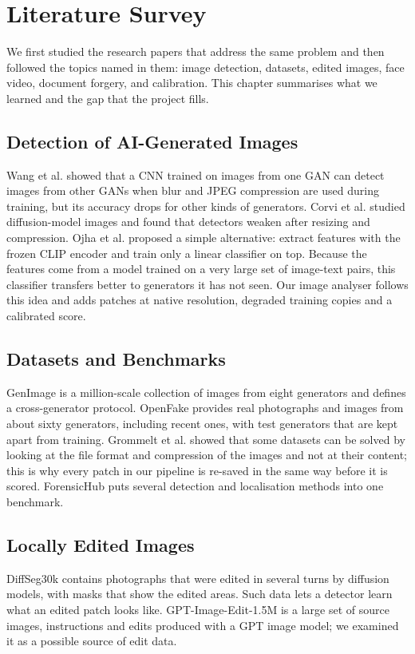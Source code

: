 \chapter{Literature Survey}
We first studied the research papers that address the same problem and then followed the topics named in them: image detection, datasets, edited images, face video, document forgery, and calibration. This chapter summarises what we learned and the gap that the project fills.

\section{Detection of AI-Generated Images}
Wang et al. \cite{wang} showed that a CNN trained on images from one GAN can detect images from other GANs when blur and JPEG compression are used during training, but its accuracy drops for other kinds of generators. Corvi et al. \cite{corvi} studied diffusion-model images and found that detectors weaken after resizing and compression. Ojha et al. \cite{ojha} proposed a simple alternative: extract features with the frozen CLIP encoder \cite{radford} and train only a linear classifier on top. Because the features come from a model trained on a very large set of image-text pairs, this classifier transfers better to generators it has not seen. Our image analyser follows this idea and adds patches at native resolution, degraded training copies and a calibrated score.

\section{Datasets and Benchmarks}
GenImage \cite{genimage} is a million-scale collection of images from eight generators and defines a cross-generator protocol. OpenFake \cite{openfake} provides real photographs and images from about sixty generators, including recent ones, with test generators that are kept apart from training. Grommelt et al. \cite{grommelt} showed that some datasets can be solved by looking at the file format and compression of the images and not at their content; this is why every patch in our pipeline is re-saved in the same way before it is scored. ForensicHub \cite{forensichub} puts several detection and localisation methods into one benchmark.

\section{Locally Edited Images}
DiffSeg30k \cite{diffseg} contains photographs that were edited in several turns by diffusion models, with masks that show the edited areas. Such data lets a detector learn what an edited patch looks like. GPT-Image-Edit-1.5M \cite{gptedit} is a large set of source images, instructions and edits produced with a GPT image model; we examined it as a possible source of edit data.

